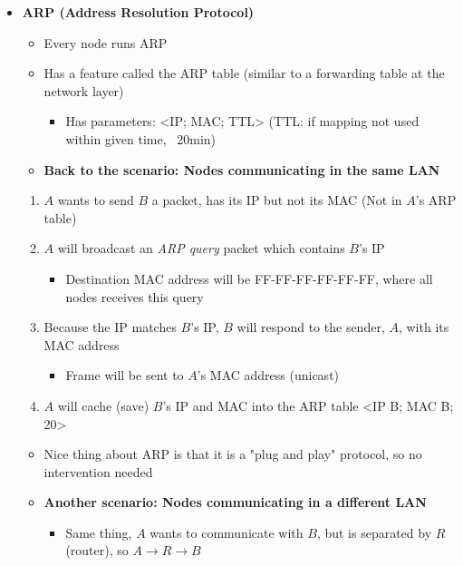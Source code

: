 \documentclass{article}
\begin{document}
\begin{itemize}
    \item \textbf{ARP (Address Resolution Protocol)}
    \begin{itemize}
        \item Every node runs ARP
        \item Has a feature called the ARP table (similar to a forwarding table at the network layer)
        \begin{itemize}
            \item Has parameters: <IP; MAC; TTL> (TTL: if mapping not used within given time, ~20min)
        \end{itemize}
        \item \textbf{Back to the scenario: Nodes communicating in the same LAN}
    \end{itemize}
    \begin{enumerate}
        \item $A$ wants to send $B$ a packet, has its IP but not its MAC (Not in $A$'s ARP table)
        \item $A$ will broadcast an \textit{ARP query} packet which contains $B$'s IP
        \begin{itemize}
            \item Destination MAC address will be FF-FF-FF-FF-FF-FF, where all nodes receives this query
        \end{itemize}
        \item Because the IP matches $B$'s IP, $B$ will respond to the sender, $A$, with its MAC address
        \begin{itemize}
            \item Frame will be sent to $A$'s MAC address (unicast)
        \end{itemize}
        \item $A$ will cache (save) $B$'s IP and MAC into the ARP table <IP B; MAC B; 20>
    \end{enumerate}
    \begin{itemize}
        \item Nice thing about ARP is that it is a "plug and play" protocol, so no intervention needed
        \item \textbf{Another scenario: Nodes communicating in a different LAN}
        \begin{itemize}
            \item Same thing, $A$ wants to communicate with $B$, but is separated by $R$ (router),
            so $A\rightarrow R \rightarrow B$

\end{itemize}
\end{itemize}
\end{itemize}
\end{document}
